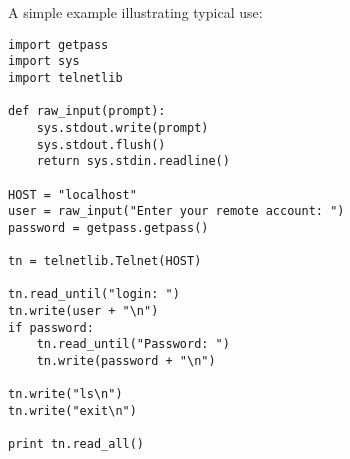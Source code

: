A simple example illustrating typical use:

\begin{verbatim}
import getpass
import sys
import telnetlib

def raw_input(prompt):
    sys.stdout.write(prompt)
    sys.stdout.flush()
    return sys.stdin.readline()

HOST = "localhost"
user = raw_input("Enter your remote account: ")
password = getpass.getpass()

tn = telnetlib.Telnet(HOST)

tn.read_until("login: ")
tn.write(user + "\n")
if password:
    tn.read_until("Password: ")
    tn.write(password + "\n")

tn.write("ls\n")
tn.write("exit\n")

print tn.read_all()
\end{verbatim}
